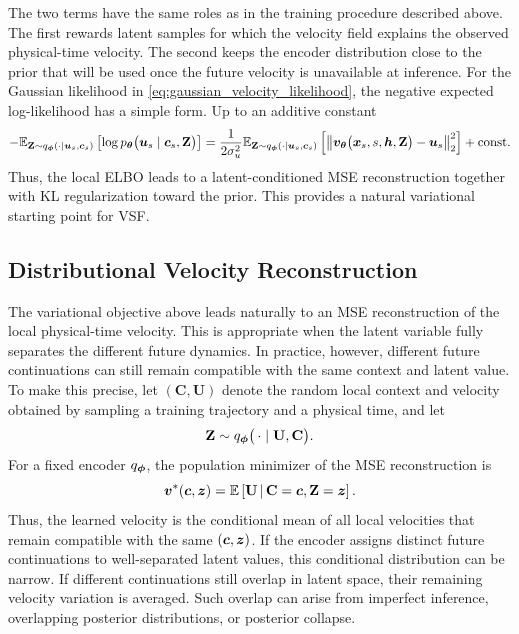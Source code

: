 The two terms have the same roles as in the training procedure described
above. The first rewards latent samples for which the velocity field explains
the observed physical-time velocity. The second keeps the encoder distribution
close to the prior that will be used once the future velocity is unavailable
at inference.
%
For the Gaussian likelihood in \cref{eq:gaussian_velocity_likelihood}, the negative expected log-likelihood has a simple form. Up to an additive constant
\begin{align*}
-
\mathbb E_{
\mathbf Z\sim
q_{\boldsymbol{\phi}}(\cdot\mid{\bm{u}}_s,{\bm{c}}_s)
}
\left[
\log
p_{{\bm{\theta}}}
\bigl(
{\bm{u}}_s
\mid
{\bm{c}}_s,\mathbf Z
\bigr)
\right]
\notag =
\frac{1}{2\sigma_u^2}
\mathbb E_{
\mathbf Z\sim
q_{\boldsymbol{\phi}}(\cdot\mid{\bm{u}}_s,{\bm{c}}_s)
}
\left[
\left\|
{\bm{v}}_{{\bm{\theta}}}
\bigl(
{\bm{x}}_s,s,{\bm{h}},\mathbf Z
\bigr)
-
{\bm{u}}_s
\right\|_2^2
\right]
+
\mathrm{const}.
\end{align*}
Thus, the local ELBO leads to a latent-conditioned MSE reconstruction together
with KL regularization toward the prior. This provides a natural variational
starting point for VSF.

\subsection{Distributional Velocity Reconstruction}
\label{sec:distributional-reconstruction}

The variational objective above leads naturally to an MSE reconstruction of
the local physical-time velocity. This is appropriate when the latent variable
fully separates the different future dynamics. In practice, however, different
future continuations can still remain compatible with the same context and
latent value. To make this precise, let $(\mathbf C,\mathbf U)$ denote the random local context and velocity obtained by sampling a training trajectory and a physical time, and let
\[
\mathbf Z
\sim
q_{\boldsymbol{\phi}}
\bigl(
\,\cdot\mid
\mathbf U,\mathbf C
\bigr).
\]
For a fixed encoder $q_{\boldsymbol{\phi}}$, the population minimizer of the MSE
reconstruction is
\begin{equation}
{\bm{v}}^*({\bm{c}},{\bm{z}})
=
\mathbb E
\left[
\mathbf U
\,\middle|\,
\mathbf C={\bm{c}},\mathbf Z={\bm{z}}
\right].
\label{eq:generic_mse_conditional_mean}
\end{equation}
Thus, the learned velocity is the conditional mean of all local velocities that
remain compatible with the same $({\bm{c}},{\bm{z}})$. If the encoder assigns distinct
future continuations to well-separated latent values, this conditional
distribution can be narrow. If different continuations still overlap in latent
space, their remaining velocity variation is averaged. Such overlap can arise
from imperfect inference, overlapping posterior distributions, or posterior
collapse.

